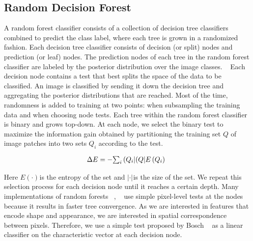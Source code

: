 \documentclass[conference,compsoc]{IEEEtran}
\begin{document}
\subsection{Random Decision Forest}A random forest classifier consists of a collection of decision tree classifiers combined to predict the class label, where each tree is grown in a randomized fashion. Each decision tree classifier consists of decision (or split) nodes and prediction (or leaf) nodes. The prediction nodes of each tree in the random forest classifier are labeled by the posterior distribution over the image classes. \unskip~\cite{1641075:26775861} Each decision node contains a test that best splits the space of the data to be classified. An image is classified by sending it down the decision tree and aggregating the posterior distributions that are reached. Most of the time, randomness is added to training at two points: when subsampling the training data and when choosing node tests. Each tree within the random forest classifier is binary and grows top-down. At each node, we select the binary test to maximize the information gain obtained by partitioning the training set $Q$ of image patches into two sets $Q_i$ according to the test.

\let\saveeqnno\theequation
\let\savefrac\frac
\def\dispfrac{\displaystyle\savefrac}
\begin{eqnarray}
\let\frac\dispfrac
\gdef\theequation{2}
\let\theHequation\theequation
\label{disp-formula-group-d27d73835da3454a817782924579e245}
\begin{array}{@{}l}\Delta E=-{\sum_i{\frac{\left(Q_i\right\vert}{\left(Q\right\vert}E\left(Q_i\right)}}\end{array}
\end{eqnarray}
\global\let\theequation\saveeqnno
\addtocounter{equation}{-1}\ignorespaces 

Here $E\left(\cdot\right) $\ensuremath{_{}}is the entropy of the set and $\left\vert \cdot\right\vert $\ensuremath{_{}}is the size of the set. We repeat this selection process for each decision node until it reaches a certain depth. Many implementations of random forests \unskip~\cite{1641075:26775846}, \unskip~\cite{1641075:26775849} use simple pixel-level tests at the nodes because it results in faster tree convergence. As we are interested in features that encode shape and appearance, we are interested in spatial correspondence between pixels. Therefore, we use a simple test proposed by Bosch \unskip~\cite{1641075:26775861} {\textemdash} as a linear classifier on the characteristic vector {\textemdash} at each decision node.
\end{document}
